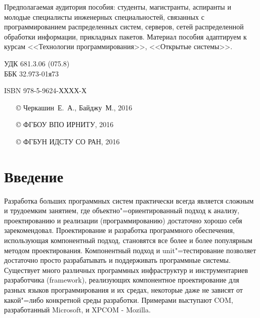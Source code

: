 \documentclass[a4paper,openany,twoside,final]{book}
\newcommand\e[1]{#1}
\begin{document}
\begin{mygroup}
\begin{minipage}[t]{0.95\linewidth}
Предполагаемая аудитория пособия: студенты, магистранты, аспиранты и молодые специалисты инженерных специальностей, связанных с программированием распределенных систем, серверов, сетей распределенной обработки информации, прикладных пакетов. Материал пособия адаптируем к курсам <<Технологии программирования>>, <<Открытые системы>>.

\mbox{}
\endgroup
\end{minipage}
\mbox{}\hspace{0.7\linewidth}
\begin{minipage}{0.3\linewidth}\small
\noindent УДК 681.3.06 (075.8)\\
\noindent ББК 32.973-01я73
\end{minipage}
\vfill
\vfill
\noindent\begin{minipage}[t]{0.35\linewidth}\small
\noindent \e{ISBN 978-5-9624-ХХХХ-Х}
\end{minipage}%
\begin{minipage}[t]{0.65\linewidth}\small
\begin{itemize}
\setlength{\itemsep}{-0.5ex}
\setlength{\parsep}{0pt}
\item[\copyright{}] Черкашин~Е.~А., Байджу~М., 2016
\item[\copyright{}] ФГБОУ ВПО ИРНИТУ, 2016
\item[\copyright{}] ФГБУН ИДСТУ СО РАН, 2016
\end{itemize}
\end{minipage}
\end{mygroup}
\newpage{}
\label{contents}
\tableofcontents



\chapter{Введение%
  \label{id1}%
}



Разработка больших программных систем практически всегда является сложным и трудоемким занятием, где объектно"=ориентированный подход к анализу, проектированию и реализации (программированию) достаточно хорошо себя зарекомендовал.  Проектирование и разработка программного обеспечения, использующая компонентный подход, становятся все более и более популярным методом проектирования.  Компонентный подход и unit"=тестирование позволяет достаточно просто разрабатывать и поддерживать программные системы.  Существует много различных программных инфраструктур и инструментариев разработчика (framework), реализующих компонентное проектирование для разных языков программирования и их средах, некоторые даже не зависят от какой"=либо конкретной среды разработки.  Примерами выступают COM, разработанный Microsoft, и XPCOM - Mozilla.
\end{document}
